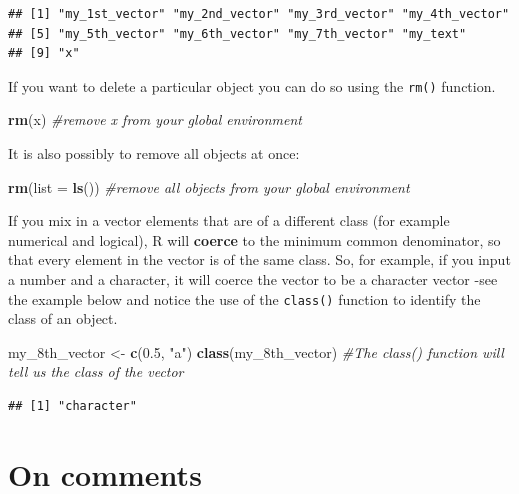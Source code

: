 \documentclass[]{book}
\newenvironment{Shaded}{\begin{snugshade}}{\end{snugshade}}
\newcommand{\CommentTok}[1]{\textcolor[rgb]{0.56,0.35,0.01}{\textit{#1}}}
\newcommand{\DataTypeTok}[1]{\textcolor[rgb]{0.13,0.29,0.53}{#1}}
\newcommand{\FloatTok}[1]{\textcolor[rgb]{0.00,0.00,0.81}{#1}}
\newcommand{\KeywordTok}[1]{\textcolor[rgb]{0.13,0.29,0.53}{\textbf{#1}}}
\newcommand{\NormalTok}[1]{#1}
\newcommand{\StringTok}[1]{\textcolor[rgb]{0.31,0.60,0.02}{#1}}
\begin{document}
\begin{verbatim}
## [1] "my_1st_vector" "my_2nd_vector" "my_3rd_vector" "my_4th_vector"
## [5] "my_5th_vector" "my_6th_vector" "my_7th_vector" "my_text"      
## [9] "x"
\end{verbatim}

If you want to delete a particular object you can do so using the \texttt{rm()} function.

\begin{Shaded}
\begin{Highlighting}[]
\KeywordTok{rm}\NormalTok{(x) }\CommentTok{#remove x from your global environment}
\end{Highlighting}
\end{Shaded}

It is also possibly to remove all objects at once:

\begin{Shaded}
\begin{Highlighting}[]
\KeywordTok{rm}\NormalTok{(}\DataTypeTok{list =} \KeywordTok{ls}\NormalTok{()) }\CommentTok{#remove all objects from your global environment}
\end{Highlighting}
\end{Shaded}

If you mix in a vector elements that are of a different class (for example numerical and logical), R will \textbf{coerce} to the minimum common denominator, so that every element in the vector is of the same class. So, for example, if you input a number and a character, it will coerce the vector to be a character vector -see the example below and notice the use of the \texttt{class()} function to identify the class of an object.

\begin{Shaded}
\begin{Highlighting}[]
\NormalTok{my_8th_vector <-}\StringTok{ }\KeywordTok{c}\NormalTok{(}\FloatTok{0.5}\NormalTok{, }\StringTok{"a"}\NormalTok{)}
\KeywordTok{class}\NormalTok{(my_8th_vector) }\CommentTok{#The class() function will tell us the class of the vector}
\end{Highlighting}
\end{Shaded}

\begin{verbatim}
## [1] "character"
\end{verbatim}

\hypertarget{on-comments}{%
\section{On comments}\label{on-comments}}
\end{document}
